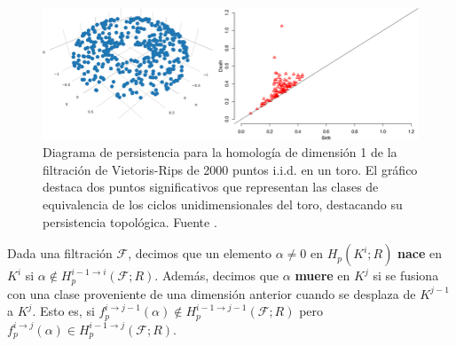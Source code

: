 \begin{figure}[h]
	\centering
	\includegraphics[width=\textwidth]{img/persistence-diagram.png}
	\caption{Diagrama de persistencia para la homología de dimensión 1 de la filtración de Vietoris-Rips de 2000 puntos i.i.d. en un toro. El gráfico destaca dos puntos significativos que representan las clases de equivalencia de los ciclos unidimensionales del toro, destacando su persistencia topológica. Fuente \cite{divol2019}.}
\end{figure}

\begin{definicion}
	Dada una filtración \(\mathcal{F}\), decimos que un elemento \(\alpha \neq 0\) en \(H_p(K^i;R)\) \textbf{nace} en \(K^i\) si \(\alpha \not\in H_{p}^{i-1 \to i}(\mathcal{F};R)\). Además, decimos que \(\alpha\) \textbf{muere} en \(K^j\) si se fusiona con una clase proveniente de una dimensión anterior cuando se desplaza de \(K^{j-1}\) a \(K^{j}\). Esto es, si \(f^{i \to j-1}_p(\alpha) \not\in H_{p}^{i-1 \to j-1}(\mathcal{F};R)\) pero \(f^{i \to j}_p(\alpha) \in H_{p}^{i-1 \to j}(\mathcal{F};R)\).
\end{definicion}

